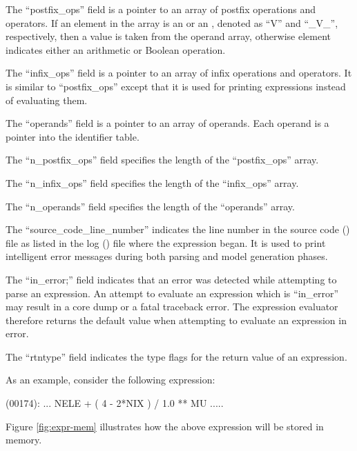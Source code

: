 The ``postfix\_ops'' field is a pointer to an array of postfix operations and
operators.   If an element in the array is an  or
an , denoted as ``V'' and ``\_V\_'', respectively, then
a value is taken from
the operand array, otherwise element indicates either an arithmetic or
Boolean operation.

The ``infix\_ops'' field is a pointer to an array of infix operations and
operators.  It is similar to ``postfix\_ops'' except that it is used for
printing expressions instead of evaluating them.

The ``operands'' field is a pointer to an array of operands.   Each operand
is a pointer into the identifier table.

The ``n\_postfix\_ops'' field specifies the length of the ``postfix\_ops''
array.

The ``n\_infix\_ops'' field specifies the length of the ``infix\_ops''
array.

The ``n\_operands'' field specifies the length of the ``operands''
array.

The ``source\_code\_line\_number'' indicates the line number in the source
code () file as listed in the log () file
where the expression began.   It is used to print intelligent
error messages during both parsing and model generation phases.

The ``in\_error;'' field indicates that an error was detected while attempting
to parse an expression.   An attempt to evaluate an expression which
is ``in\_error'' may result in a core dump or a fatal traceback error.
The expression evaluator therefore returns the default value when attempting to
evaluate an expression in error.

The ``rtntype'' field indicates the type flags for the return value of an
expression.

As an example, consider the following expression:
\begin{logfileexample}
(00174): ... NELE + ( 4 - 2*NIX ) / 1.0 ** MU .....
\end{logfileexample}

Figure \ref{fig:expr-mem} illustrates how the
above expression will be stored in memory.

